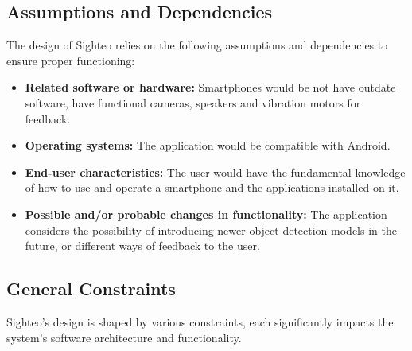 \documentclass{FastFyp}
\begin{document}
\subsection{Assumptions and Dependencies}
The design of Sighteo relies on the following assumptions and dependencies to ensure proper functioning:
\begin{itemize}
\item \textbf{Related software or hardware:} Smartphones would be not have outdate software, have functional cameras, speakers and vibration motors for feedback. 

\item \textbf{Operating systems:} The application would be compatible with Android.

\item \textbf{End-user characteristics:} The user would have the fundamental knowledge of how to use and operate a smartphone and the applications installed on it.

\item \textbf{Possible and/or probable changes in functionality:} The application considers the possibility of introducing newer object detection models in the future, or different ways of feedback to the user.

\end{itemize}


\subsection{General Constraints}
Sighteo's design is shaped by various constraints, each significantly impacts the system’s software architecture and functionality.
\end{document}
